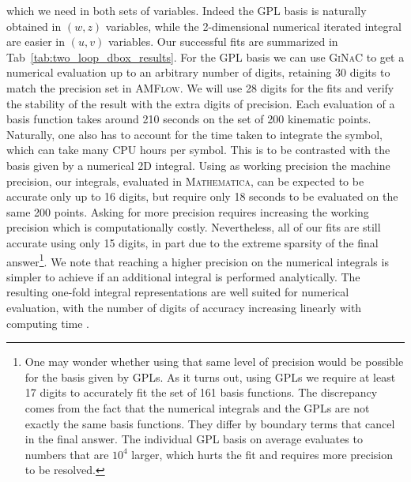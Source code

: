 \documentclass[a4paper,11pt]{article}
\begin{document}
which we need in both sets of variables. Indeed the GPL basis is naturally obtained in $(w,z)$ variables, while the 2-dimensional numerical iterated integral are easier in $(u,v)$ variables. Our successful fits are summarized in Tab~\ref{tab:two_loop_dbox_results}. For the GPL basis we can use \textsc{GiNaC} to get a numerical evaluation up to an arbitrary number of digits, retaining 30 digits to match the precision set in \textsc{AMFlow}. We will use 28 digits for the fits and verify the stability of the result with the extra digits of precision. Each evaluation of a basis function takes around 210 seconds on the set of 200 kinematic points. Naturally, one also has to account for the time taken to integrate the symbol, which can take many CPU hours per symbol. This is to be contrasted with the basis given by a numerical 2D integral. Using as working precision the machine precision, our integrals, evaluated in \textsc{Mathematica}, can be expected to be accurate only up to 16 digits, but require only 18 seconds to be evaluated on the same 200 points. Asking for more precision requires increasing the working precision which is computationally costly. Nevertheless, all of our fits are still accurate using only 15 digits, in part due to the extreme sparsity of the final answer\footnote{One may wonder whether using that same level of precision would be possible for the basis given by GPLs. As it turns out, using GPLs we require at least 17 digits to accurately fit the set of 161 basis functions. The discrepancy comes from the fact that the numerical integrals and the GPLs are not exactly the same basis functions. They differ by boundary terms that cancel in the final answer. The individual GPL basis on average evaluates to numbers that are $10^4$ larger, which hurts the fit and requires more precision to be resolved.}. We note that reaching a higher precision on the numerical integrals is simpler to achieve if an additional integral is performed analytically. The resulting one-fold integral representations are well suited for numerical evaluation, with the number of digits of accuracy increasing linearly with computing time \cite{Henn:2013pwa, Henn:2014qga}.
\end{document}
